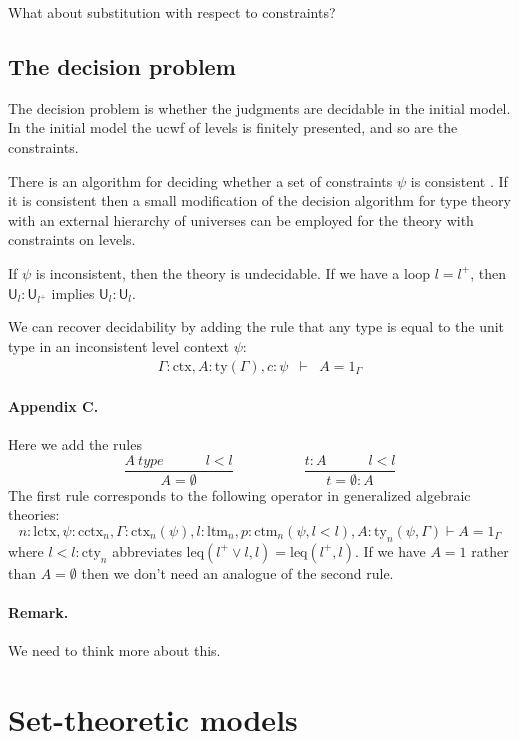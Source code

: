 \documentclass[11pt,a4paper]{article}
\theoremstyle{definition}
\newcommand{\UU}{\mathsf{U}}
\def\UU{\mathsf{U}}
\def\lctx{\mathrm{lctx}}
\def\ltm{\mathrm{ltm}}
\def\leq{\mathrm{leq}}
\def\cctx{\mathrm{cctx}}
\def\cty{\mathrm{cty}}
\def\ctm{\mathrm{ctm}}
\newcommand{\ctx}{\mathrm{ctx}}
\newcommand{\ty}{\mathrm{ty}}
\begin{document}
What about substitution with respect to constraints?

\subsection{The decision problem}

The decision problem is whether the judgments are decidable in the initial model. In the initial model the ucwf of levels is finitely presented, and so are the constraints.

There is an algorithm for deciding whether a set of constraints $\psi$ is consistent \cite{bezem-coquand:lattices}. If it is consistent then a small modification of the decision algorithm for type theory with an external hierarchy of universes can be employed for the theory with constraints on levels.

If $\psi$ is inconsistent, then the theory is undecidable. If we have a loop $l = l^+$, then $\UU_l : \UU_{l^+}$ implies $\UU_l : \UU_l$.

We can recover decidability by adding the rule that any type is equal to the unit type in an inconsistent level context $\psi$:
\begin{eqnarray*}
 \Gamma : \ctx, A  : \ty(\Gamma), c : \psi &\vdash& A = 1_\Gamma
\end{eqnarray*}

\paragraph{Appendix C.} Here we add the rules
$$
\frac{A\ type\hspace{3em}l < l}{A = \emptyset}
\hspace{5em}
\frac{t : A\hspace{3em}l < l}{t = \emptyset : A}
$$
The first rule corresponds to the following operator in generalized algebraic theories:
$$
n : \lctx, \psi : \cctx_n, \Gamma : \ctx_n(\psi), l : \ltm_n, p : \ctm_n(\psi,l < l), A : \ty_n(\psi,\Gamma)
\vdash
A = 1_\Gamma
$$
where $l < l : \cty_n$ abbreviates $\leq(l^+ \vee l,l) = \leq(l^+,l)$. If we have $A = 1$ rather than $A = \emptyset$ then we don't need an analogue of the second rule.  


\paragraph{Remark.} We need to think more about this.

\section{Set-theoretic models}
\end{document}

